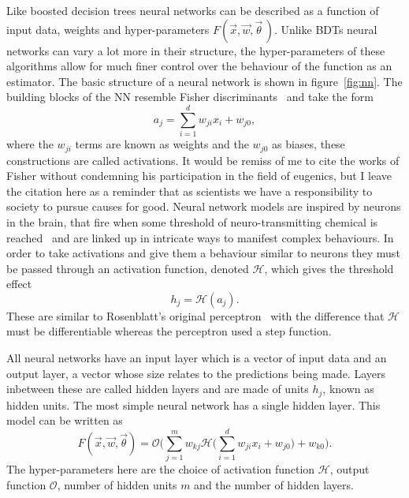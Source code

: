 Like boosted decision trees neural networks can be described as a function of
input data, weights and hyper-parameters $F(\vec{x}, \vec{w}, \vec{\theta} \,)$.
Unlike BDTs neural networks can vary a lot more in their structure, the
hyper-parameters of these algorithms allow for much finer control over the
behaviour of the function as an estimator. The basic structure of a neural
network is shown in figure~\ref{fig:nn}.  The building blocks of the NN resemble
Fisher discriminants~\cite{Fisher} and take the form
\begin{equation}
a_j = \sum_{i=1}^{d} w_{ji}x_{i} + w_{j0},
\label{eq:fisher}
\end{equation}
where the $w_{ji}$ terms are known as weights and the $w_{j0}$ as biases, these
constructions are called activations. It would be remiss of me to cite the works
of Fisher without condemning his participation in the field of eugenics, but I
leave the citation here as a reminder that as scientists we have a
responsibility to society to pursue causes for good. Neural network models are
inspired by neurons in the brain, that fire when some threshold of
neuro-transmitting chemical is reached~\cite{neuron} and are linked up in
intricate ways to manifest complex behaviours. In order to take activations and
give them a behaviour similar to neurons they must be passed through an
activation function, denoted $\mathcal{H}$, which gives the threshold effect
\begin{equation}
h_j = \mathcal{H}(a_j).
\label{eq:hiddenunit}
\end{equation}
These are similar to Rosenblatt's original perceptron~\cite{Rosenblatt} with the
difference that $\mathcal{H}$ must be differentiable whereas the perceptron used
a step function.

All neural networks  have an input layer which is a vector of input data and an
output layer, a vector whose size relates to the predictions being made. Layers
inbetween these are called hidden layers and are made of units $h_j$, known as
hidden units. The most simple neural network has a single hidden layer. This
model can be written as
\begin{equation}
F(\vec{x},\vec{w}, \vec{\theta}) = \mathcal{O} \Bigg( \sum_{j=1}^{m} w_{kj}
\mathcal{H} \Bigg( \sum_{i=1}^{d} w_{ji} x_{i} + w_{j0} \Bigg) + w_{k0} \Bigg).
\label{eq:basicnn}
\end{equation}
 The hyper-parameters here are the choice of activation function $\mathcal{H}$,
 output function $\mathcal{O}$, number of hidden units $m$ and the number of
 hidden layers.
 
